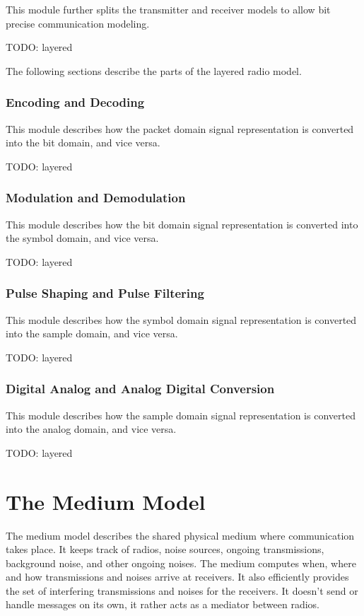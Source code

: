 This module further splits the transmitter and receiver models to allow bit
precise communication modeling.

TODO: layered

The following sections describe the parts of the layered radio model.

\subsubsection{Encoding and Decoding}

This module describes how the packet domain signal representation is converted
into the bit domain, and vice versa.

TODO: layered

\subsubsection{Modulation and Demodulation}

This module describes how the bit domain signal representation is converted into
the symbol domain, and vice versa.

TODO: layered

\subsubsection{Pulse Shaping and Pulse Filtering}

This module describes how the symbol domain signal representation is converted
into the sample domain, and vice versa.

TODO: layered


\subsubsection{Digital Analog and Analog Digital Conversion}

This module describes how the sample domain signal representation is converted
into the analog domain, and vice versa.

TODO: layered
\fi

\section{The Medium Model}

The medium model describes the shared physical medium where communication takes
place. It keeps track of radios, noise sources, ongoing transmissions,
background noise, and other ongoing noises. The medium computes when, where and
how transmissions and noises arrive at receivers. It also efficiently provides
the set of interfering transmissions and noises for the receivers. It doesn't
send or handle messages on its own, it rather acts as a mediator between radios.

